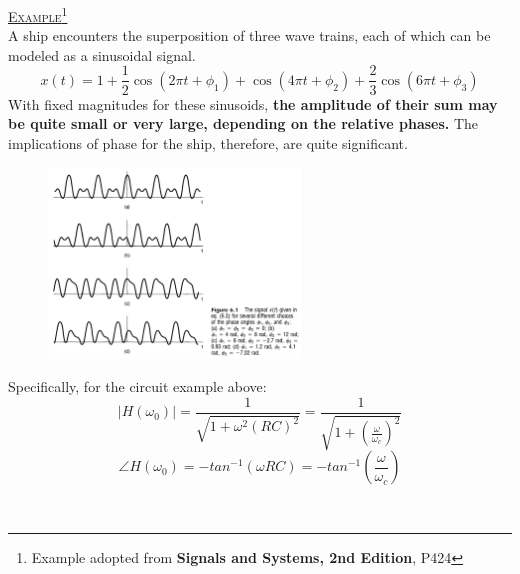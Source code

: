 \documentclass[12pt,a4paper]{article}
\begin{document}
\begin{tcolorbox}[breakable]
\underline{\textsc{Example}}\footnote{Example adopted from \textbf{Signals and Systems, 2nd Edition}, P424}\\
A ship encounters the superposition of three wave trains, each of which can be modeled as a sinusoidal signal. 
\[ x(t) = 1+\frac{1}{2}\cos(2\pi t + \phi_{1})+\cos(4\pi t + \phi_{2})+\frac{2}{3}\cos(6\pi t + \phi_{3})\]
With fixed magnitudes for these sinusoids, \textbf{the amplitude of their sum may be quite small or very large, depending on the relative phases.} The implications of phase for the ship, therefore, are quite significant. 
\begin{figure}[H] \centering
\includegraphics[width=0.6\textwidth]{images/phase}
\end{figure}
\end{tcolorbox}

Specifically, for the circuit example above:
\[ \lvert H(\omega_{0}) \rvert =  \frac{1}{\sqrt{1+\omega^{2}(RC)^{2} }} = \frac{1}{\sqrt{1+(\frac{\omega}{\omega_{c}})^{2}}} \]
\[ \angle H(\omega_{0}) = -tan^{-1}(\omega RC) = -tan^{-1}(\frac{\omega}{\omega_{c}})\]


\ \\
\end{document}
